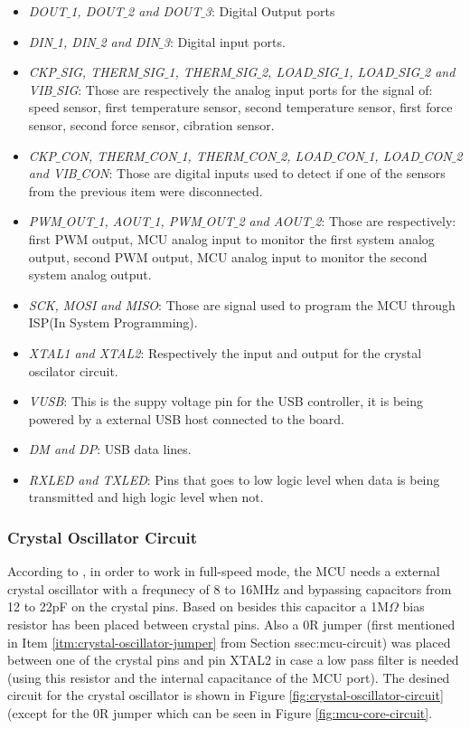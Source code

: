 			\begin{itemize}
				\item\textit{DOUT$\_$1, DOUT$\_$2 and DOUT$\_$3}: Digital Output ports	
				\item\textit{DIN$\_$1, DIN$\_$2 and DIN$\_$3}: Digital input ports.
				\item\textit{CKP$\_$SIG, THERM$\_$SIG$\_$1, THERM$\_$SIG$\_$2, LOAD$\_$SIG$\_$1, LOAD$\_$SIG$\_$2 and VIB$\_$SIG}: Those are respectively the analog input ports for the signal of: speed sensor, first temperature sensor, second temperature sensor, first force sensor, second force sensor, cibration sensor.
				\item\textit{CKP$\_$CON, THERM$\_$CON$\_$1, THERM$\_$CON$\_$2, LOAD$\_$CON$\_$1, LOAD$\_$CON$\_$2 and VIB$\_$CON}: Those are digital inputs used to detect if one of the sensors from the previous item were disconnected.
				\item\textit{PWM$\_$OUT$\_$1, AOUT$\_$1, PWM$\_$OUT$\_$2 and AOUT$\_$2}: Those are respectively: first PWM output, MCU analog input to monitor the first system analog output, second PWM output, MCU analog input to monitor the second system analog output.
				\item\textit{SCK, MOSI and MISO}: Those are signal used to program the MCU through ISP(In System Programming).
				\item\textit{XTAL1 and XTAL2}: Respectively the input and output for the crystal oscilator circuit.
				\item\textit{VUSB}: This is the suppy voltage pin for the USB controller, it is being powered by a external USB host connected to the board.
				\item\textit{DM and DP}: USB data lines.
				\item\textit{RXLED and TXLED}: Pins that goes to low logic level when data is being transmitted and high logic level when not.
			\end{itemize}

		\subsubsection{Crystal Oscillator Circuit}\label{sssec:crystal-oscillator-circuit}
			According to \cite{atmega3284-datasheet}, in order to work in full-speed mode, the MCU needs a external crystal oscillator with a frequnecy of 8 to 16MHz and bypassing capacitors from 12 to 22pF on the crystal pins. Based on \cite{arduino-leonardo-schematic} besides this capacitor a 1M$\Omega$ bias resistor has been placed between crystal pins. Also a 0R jumper (first mentioned in Item \ref{itm:crystal-oscillator-jumper} from Section {ssec:mcu-circuit}) was placed between one of the crystal pins and pin XTAL2 in case a low pass filter is needed (using this resistor and the internal capacitance of the MCU port). The desined circuit for the crystal oscillator is shown in Figure \ref{fig:crystal-oscillator-circuit} (except for the 0R jumper which can be seen in Figure \ref{fig:mcu-core-circuit}.

